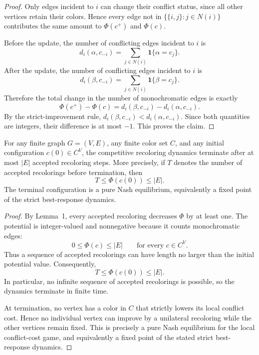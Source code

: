 \begin{proof}
Only edges incident to $i$ can change their conflict status, since all other
vertices retain their colors. Hence every edge not in
$\{\{i,j\}:j\in N(i)\}$ contributes the same amount to $\Phi(c^+)$ and
$\Phi(c)$.

Before the update, the number of conflicting edges incident to $i$ is
\[
    d_i(\alpha,c_{-i})
    =
    \sum_{j\in N(i)} \mathbf{1}\{\alpha=c_j\}.
\]
After the update, the number of conflicting edges incident to $i$ is
\[
    d_i(\beta,c_{-i})
    =
    \sum_{j\in N(i)} \mathbf{1}\{\beta=c_j\}.
\]
Therefore the total change in the number of monochromatic edges is exactly
\[
    \Phi(c^+)-\Phi(c)
    =
    d_i(\beta,c_{-i})-d_i(\alpha,c_{-i}).
\]
By the strict-improvement rule,
$d_i(\beta,c_{-i})<d_i(\alpha,c_{-i})$. Since both quantities are integers,
their difference is at most $-1$. This proves the claim.
\end{proof}

\begin{theorem}
For any finite graph $G=(V,E)$, any finite color set $C$, and any initial
configuration $c(0)\in C^V$, the competitive recoloring dynamics terminate
after at most $|E|$ accepted recoloring steps. More precisely, if $T$ denotes
the number of accepted recolorings before termination, then
\[
    T \le \Phi(c(0)) \le |E|.
\]
The terminal configuration is a pure Nash equilibrium, equivalently a fixed
point of the strict best-response dynamics.
\end{theorem}

\begin{proof}
By Lemma~1, every accepted recoloring decreases $\Phi$ by at least one. The
potential is integer-valued and nonnegative because it counts monochromatic
edges:
\[
    0 \le \Phi(c) \le |E|
    \qquad \text{for every } c\in C^V .
\]
Thus a sequence of accepted recolorings can have length no larger than the
initial potential value. Consequently,
\[
    T \le \Phi(c(0)) \le |E|.
\]
In particular, no infinite sequence of accepted recolorings is possible, so
the dynamics terminate in finite time.

At termination, no vertex has a color in $C$ that strictly lowers its local
conflict cost. Hence no individual vertex can improve by a unilateral
recoloring while the other vertices remain fixed. This is precisely a pure
Nash equilibrium for the local conflict-cost game, and equivalently a fixed
point of the stated strict best-response dynamics.
\end{proof}

